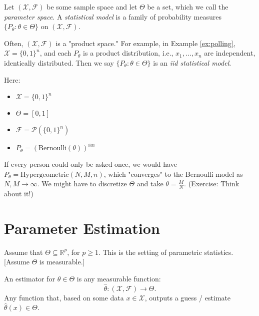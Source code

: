 \documentclass[open=any, 11pt,paper=A4]{scrreprt}
\begin{document}
\begin{definition}\label{def:statmodel}
Let \((\mathcal{X}, \mathcal{F})\) be some sample space and let \(\Theta\) be a set, which we call the \textit{parameter space}. A \textit{statistical model} is a family of probability measures \(\{P_\theta : \theta \in \Theta\}\) on \((\mathcal{X}, \mathcal{F})\).
\end{definition}

\begin{remark}
Often, \((\mathcal{X}, \mathcal{F})\) is a "product space." For example, in Example \ref{ex:polling}, \(\mathcal{X} = \{0, 1\}^n\), and each \(P_\theta\) is a product distribution, i.e., \(x_1, \dots, x_n\) are independent, identically distributed. Then we say \(\{P_\theta : \theta \in \Theta\}\) is an \textit{iid statistical model}.
\end{remark}

\begin{remark}
Here:
\begin{itemize}
    \item \(\mathcal{X} = \{0, 1\}^n\)
    \item \(\Theta = [0, 1]\)
    \item \(\mathcal{F} = \mathcal{P}(\{0, 1\}^n)\)
    \item \(P_\theta = (\text{Bernoulli}(\theta))^{\otimes n}\)
\end{itemize}
\end{remark}

\begin{remark}
If every person could only be asked once, we would have \( P_\theta = \text{Hypergeometric}(N, M, n) \), which "converges" to the Bernoulli model as \( N, M \to \infty \). 
We might have to discretize \(\Theta\) and take \( \theta = \frac{M}{N} \). 
(Exercise: Think about it!)
\end{remark}

\chapter{Parameter Estimation}
Assume that \( \Theta \subseteq \mathbb{R}^p \), for \( p \geq 1 \). This is the setting of parametric statistics. 
[Assume \(\Theta\) is measurable.]

\begin{definition}[Estimator]\label{def:estimator}
An estimator for \( \theta \in \Theta \) is any measurable function:
\[
\hat{\theta}: (\mathcal{X}, \mathcal{F}) \to \Theta.
\]
Any function that, based on some data \( x \in \mathcal{X} \), outputs a guess / estimate \( \hat{\theta}(x) \in \Theta \).
\end{definition}
\end{document}
